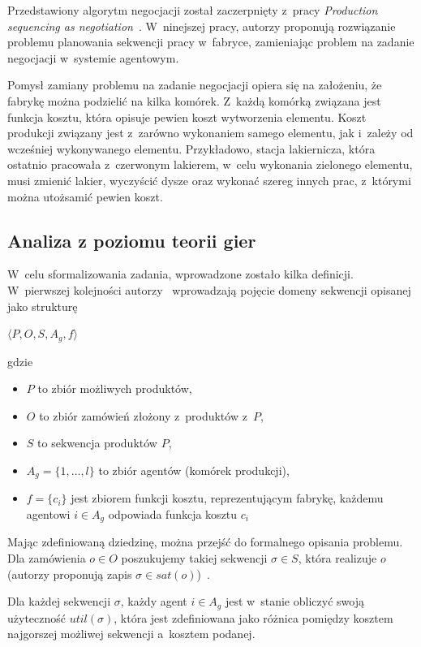 Przedstawiony algorytm negocjacji został zaczerpnięty z~pracy \emph{Production sequencing as negotiation}~\cite{wooldridge1996production}. W~ninejszej pracy, autorzy proponują rozwiązanie problemu planowania sekwencji pracy w~fabryce, zamieniając problem na zadanie negocjacji w~systemie agentowym.

Pomysł zamiany problemu na zadanie negocjacji opiera się na założeniu, że fabrykę można podzielić na kilka komórek. Z~każdą komórką związana jest funkcja kosztu, która opisuje pewien koszt wytworzenia elementu. Koszt produkcji związany jest z~zarówno wykonaniem samego elementu, jak i~zależy od wcześniej wykonywanego elementu. Przykładowo, stacja lakiernicza, która ostatnio pracowała z~czerwonym lakierem, w~celu wykonania zielonego elementu, musi zmienić lakier, wyczyścić dysze oraz wykonać szereg innych prac, z~którymi można utożsamić pewien koszt.

\subsection{Analiza z poziomu teorii gier}
W~celu sformalizowania zadania, wprowadzone zostało kilka definicji. W~pierwszej kolejności autorzy~\cite{wooldridge1996production} wprowadzają pojęcie domeny sekwencji opisanej jako strukturę
\begin{center}
    $ \big \langle P, O, S, A_{g}, f \big \rangle$
\end{center}
gdzie 
\begin{itemize}
    \item $P$ to zbiór możliwych produktów,
    \item $O$ to zbiór zamówień złożony z~produktów z~$P$,
    \item $S$ to sekwencja produktów $P$,
    \item $A_{g} = \{1, \dots, l\}$ to zbiór agentów (komórek produkcji),
    \item $f = \{c_{i}\}$ jest zbiorem funkcji kosztu, reprezentującym fabrykę, każdemu agentowi $i \in A_{g}$ odpowiada funkcja kosztu $c_{i}$
\end{itemize}

Mając zdefiniowaną dziedzinę, można przejść do formalnego opisania problemu. Dla zamówienia $o \in O$ poszukujemy takiej sekwencji $\sigma \in S$, która realizuje $o$ (autorzy proponują zapis $\sigma \in sat(o)$)~\cite{rosenschein1994rules}.

Dla każdej sekwencji $\sigma$, każdy agent $i \in A_{g}$ jest w~stanie obliczyć swoją użyteczność $util(\sigma)$, która jest zdefiniowana jako różnica pomiędzy kosztem najgorszej możliwej sekwencji a~kosztem podanej. 

